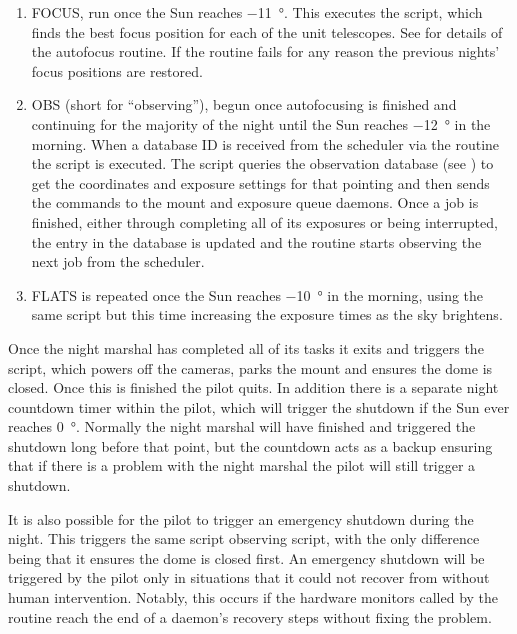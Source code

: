 \begin{colsection}
\begin{enumerate}
\item FOCUS, run once the Sun reaches \SI{-11}{\degree}. This executes the  script, which finds the best focus position for each of the unit telescopes. See  for details of the autofocus routine. If the routine fails for any reason the previous nights' focus positions are restored.

\item OBS (short for ``observing''), begun once autofocusing is finished and continuing for the majority of the night until the Sun reaches \SI{-12}{\degree} in the morning. When a database ID is received from the scheduler via the  routine the  script is executed. The script queries the observation database (see ) to get the coordinates and exposure settings for that pointing and then sends the commands to the mount and exposure queue daemons. Once a job is finished, either through completing all of its exposures or being interrupted, the entry in the database is updated and the routine starts observing the next job from the scheduler.

\item FLATS is repeated once the Sun reaches \SI{-10}{\degree} in the morning, using the same script but this time increasing the exposure times as the sky brightens.

\end{enumerate}

Once the night marshal has completed all of its tasks it exits and triggers the  script, which powers off the cameras, parks the mount and ensures the dome is closed. Once this is finished the pilot quits. In addition there is a separate night countdown timer within the pilot, which will trigger the shutdown if the Sun ever reaches \SI{0}{\degree}. Normally the night marshal will have finished and triggered the shutdown long before that point, but the countdown acts as a backup ensuring that if there is a problem with the night marshal the pilot will still trigger a shutdown.

\newpage

It is also possible for the pilot to trigger an emergency shutdown during the night. This triggers the same  script observing script, with the only difference being that it ensures the dome is closed first. An emergency shutdown will be triggered by the pilot only in situations that it could not recover from without human intervention. Notably, this occurs if the hardware monitors called by the  routine reach the end of a daemon's recovery steps without fixing the problem.

\end{colsection}


